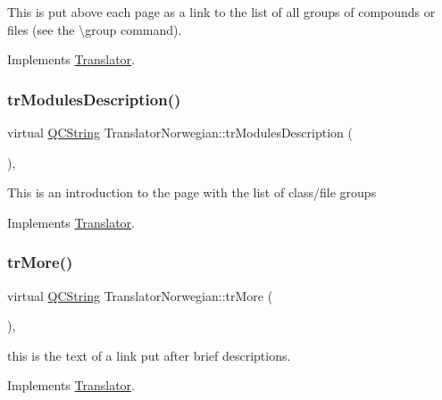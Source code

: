 This is put above each page as a link to the list of all groups of compounds or files (see the \textbackslash{}group command). 

Implements \mbox{\hyperlink{class_translator}{Translator}}.

\mbox{\label{class_translator_norwegian_adbf4e95c60739c0f92fdcd595f9e6451}} 
\subsubsection{\texorpdfstring{trModulesDescription()}{trModulesDescription()}}
{\footnotesize\ttfamily virtual \mbox{\hyperlink{class_q_c_string}{Q\+C\+String}} Translator\+Norwegian\+::tr\+Modules\+Description (\begin{DoxyParamCaption}{ }\end{DoxyParamCaption})\hspace{0.3cm}{\ttfamily [inline]}, {\ttfamily [virtual]}}

This is an introduction to the page with the list of class/file groups 

Implements \mbox{\hyperlink{class_translator}{Translator}}.

\mbox{\label{class_translator_norwegian_a4b510617cde2b03aaca24fb7bd477d17}} 
\subsubsection{\texorpdfstring{trMore()}{trMore()}}
{\footnotesize\ttfamily virtual \mbox{\hyperlink{class_q_c_string}{Q\+C\+String}} Translator\+Norwegian\+::tr\+More (\begin{DoxyParamCaption}{ }\end{DoxyParamCaption})\hspace{0.3cm}{\ttfamily [inline]}, {\ttfamily [virtual]}}

this is the text of a link put after brief descriptions. 

Implements \mbox{\hyperlink{class_translator}{Translator}}.

\mbox{\label{class_translator_norwegian_ab644f977790ca08fbe30dafdd38f2811}} 
